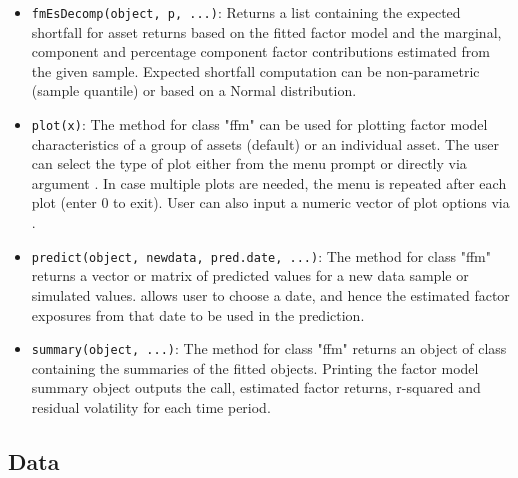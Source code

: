 \documentclass[a4paper]{article}\usepackage[]{graphicx}\usepackage[]{color}
\begin{document}
\begin{itemize}
\item \verb"fmEsDecomp(object, p, ...)": Returns a list containing the expected shortfall for asset returns based on the fitted factor model and the marginal, component and percentage component factor contributions estimated from the given sample. Expected shortfall computation can be non-parametric (sample quantile) or based on a Normal distribution.

\item \verb"plot(x)": The  method for class "ffm" can be used for plotting factor model characteristics of a group of assets (default) or an individual asset. The user can select the type of plot either from the menu prompt or directly via argument . In case multiple plots are needed, the menu is repeated after each plot (enter 0 to exit). User can also input a numeric vector of plot options via .

\item \verb"predict(object, newdata, pred.date, ...)": The  method for class "ffm" returns a vector or matrix of predicted values for a new data sample or simulated values.  allows user to choose a date, and hence the estimated factor exposures from that date to be used in the prediction.

\item \verb"summary(object, ...)": The  method for class "ffm" returns an object of class  containing the summaries of the fitted objects. Printing the factor model summary object outputs the call, estimated factor returns, r-squared and residual volatility for each time period. 

\end{itemize}

\subsection{Data}
\end{document}
